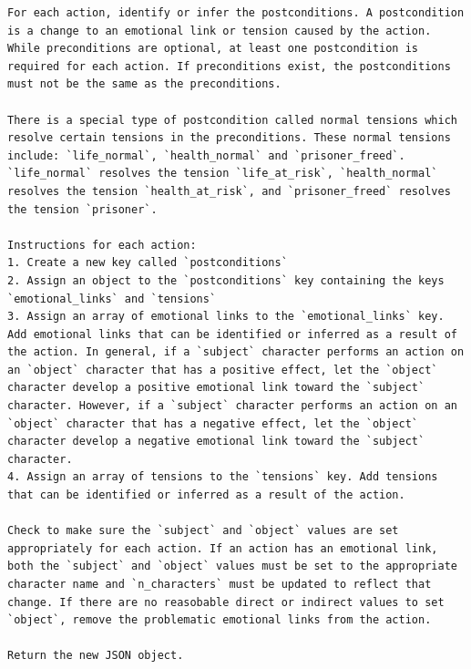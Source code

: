 \documentclass[phd,electronic,oneside,twosidetoc,letterpaper,chaptercenter,parttop,lof]{byumsphd}
\begin{document}
\begin{lstlisting}[style=mypromptstyle, caption={Postconditions}, label={lst:postconditions}]
For each action, identify or infer the postconditions. A postcondition is a change to an emotional link or tension caused by the action. While preconditions are optional, at least one postcondition is required for each action. If preconditions exist, the postconditions must not be the same as the preconditions.

There is a special type of postcondition called normal tensions which resolve certain tensions in the preconditions. These normal tensions include: `life_normal`, `health_normal` and `prisoner_freed`. `life_normal` resolves the tension `life_at_risk`, `health_normal` resolves the tension `health_at_risk`, and `prisoner_freed` resolves the tension `prisoner`.

Instructions for each action:
1. Create a new key called `postconditions`
2. Assign an object to the `postconditions` key containing the keys `emotional_links` and `tensions`
3. Assign an array of emotional links to the `emotional_links` key. Add emotional links that can be identified or inferred as a result of the action. In general, if a `subject` character performs an action on an `object` character that has a positive effect, let the `object` character develop a positive emotional link toward the `subject` character. However, if a `subject` character performs an action on an `object` character that has a negative effect, let the `object` character develop a negative emotional link toward the `subject` character.
4. Assign an array of tensions to the `tensions` key. Add tensions that can be identified or inferred as a result of the action.

Check to make sure the `subject` and `object` values are set appropriately for each action. If an action has an emotional link, both the `subject` and `object` values must be set to the appropriate character name and `n_characters` must be updated to reflect that change. If there are no reasobable direct or indirect values to set `object`, remove the problematic emotional links from the action.

Return the new JSON object.
\end{lstlisting}
\end{document}
